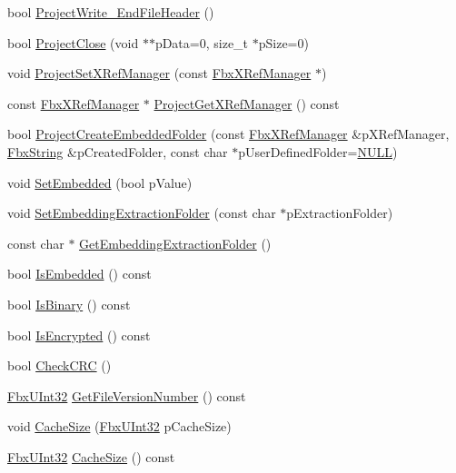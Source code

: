 \begin{Indent}
\begin{DoxyCompactItemize}
\item 
bool \hyperlink{class_fbx_i_o_a577f707fb403e1fb1c865a079e48251f}{Project\+Write\+\_\+\+End\+File\+Header} ()
\item 
bool \hyperlink{class_fbx_i_o_a622f4b331475288b8e25c7e3dbb37b02}{Project\+Close} (void $\ast$$\ast$p\+Data=0, size\+\_\+t $\ast$p\+Size=0)
\item 
void \hyperlink{class_fbx_i_o_a7064f301bce688c750ed1427e5babc61}{Project\+Set\+X\+Ref\+Manager} (const \hyperlink{class_fbx_x_ref_manager}{Fbx\+X\+Ref\+Manager} $\ast$)
\item 
const \hyperlink{class_fbx_x_ref_manager}{Fbx\+X\+Ref\+Manager} $\ast$ \hyperlink{class_fbx_i_o_a848f9a7d818160eae6e231cd15ea8c9f}{Project\+Get\+X\+Ref\+Manager} () const
\item 
bool \hyperlink{class_fbx_i_o_ae809d2df185a3cd8ec31d6ef3a565dfb}{Project\+Create\+Embedded\+Folder} (const \hyperlink{class_fbx_x_ref_manager}{Fbx\+X\+Ref\+Manager} \&p\+X\+Ref\+Manager, \hyperlink{class_fbx_string}{Fbx\+String} \&p\+Created\+Folder, const char $\ast$p\+User\+Defined\+Folder=\hyperlink{fbxarch_8h_a070d2ce7b6bb7e5c05602aa8c308d0c4}{N\+U\+LL})
\item 
void \hyperlink{class_fbx_i_o_a8de78a369702272e272acebc07b91d26}{Set\+Embedded} (bool p\+Value)
\item 
void \hyperlink{class_fbx_i_o_a742d963ed9bc37d36527d3c27dbe86fd}{Set\+Embedding\+Extraction\+Folder} (const char $\ast$p\+Extraction\+Folder)
\item 
const char $\ast$ \hyperlink{class_fbx_i_o_a2ea4b80afa1146ffb14800046fa582d3}{Get\+Embedding\+Extraction\+Folder} ()
\item 
bool \hyperlink{class_fbx_i_o_aa9ad1b3f82deb8bc555c2469d9ea79d9}{Is\+Embedded} () const
\item 
bool \hyperlink{class_fbx_i_o_abbc12089fd9865a4e570e4ee6b4bab4a}{Is\+Binary} () const
\item 
bool \hyperlink{class_fbx_i_o_ade6fc2ff55191b403423001046b951cb}{Is\+Encrypted} () const
\item 
bool \hyperlink{class_fbx_i_o_a736496aefdcad9fb0ac5362ae4c3f54e}{Check\+C\+RC} ()
\item 
\hyperlink{fbxtypes_8h_a53c19005808129cb4efa0dcbb71fdb09}{Fbx\+U\+Int32} \hyperlink{class_fbx_i_o_a4a42a8eab3c6d947fabc1a3625f3548d}{Get\+File\+Version\+Number} () const
\item 
void \hyperlink{class_fbx_i_o_aa60c36412a1a48e44fbdb41fe9a31394}{Cache\+Size} (\hyperlink{fbxtypes_8h_a53c19005808129cb4efa0dcbb71fdb09}{Fbx\+U\+Int32} p\+Cache\+Size)
\item 
\hyperlink{fbxtypes_8h_a53c19005808129cb4efa0dcbb71fdb09}{Fbx\+U\+Int32} \hyperlink{class_fbx_i_o_a8a06f9cca3b61b927401a1283e072ee4}{Cache\+Size} () const
\end{DoxyCompactItemize}
\end{Indent}

